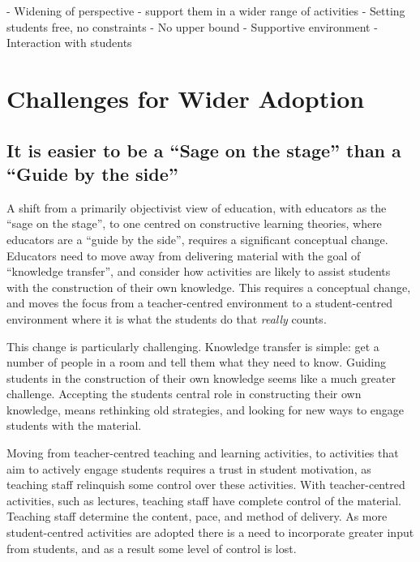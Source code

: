 - Widening of perspective - support them in a wider range of activities
- Setting students free, no constraints
- No upper bound
- Supportive environment
- Interaction with students



\clearpage
\section{Challenges for Wider Adoption} %
\label{sec:challenges_for_wider_adoption}

\subsection{It is easier to be a ``Sage on the stage'' than a ``Guide by the side''} %
\label{sub:adopting_constructive_learning_theories}

A shift from a primarily objectivist view of education, with educators as the ``sage on the stage'', to one centred on constructive learning theories, where educators are a ``guide by the side'', requires a significant conceptual change. Educators need to move away from delivering material with the goal of ``knowledge transfer'', and consider how activities are likely to assist students with the construction of their own knowledge. This requires a conceptual change, and moves the focus from a teacher-centred environment to a student-centred environment where it is what the students do that \emph{really} counts.

This change is particularly challenging. Knowledge transfer is simple: get a number of people in a room and tell them what they need to know. Guiding students in the construction of their own knowledge seems like a much greater challenge. Accepting the students central role in constructing their own knowledge, means rethinking old strategies, and looking for new ways to engage students with the material. 

Moving from teacher-centred teaching and learning activities, to activities that aim to actively engage students requires a trust in student motivation, as teaching staff relinquish some control over these activities. With teacher-centred activities, such as lectures, teaching staff have complete control of the material. Teaching staff determine the content, pace, and method of delivery. As more student-centred activities are adopted there is a need to incorporate greater input from students, and as a result some level of control is lost. 



